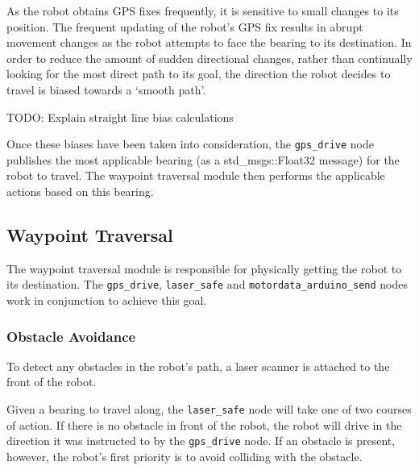 \documentclass[titlepage,12pt,a4paper]{article}
\begin{document}
As the robot obtains GPS fixes frequently, it is sensitive to small changes to its position. The frequent updating of the robot's GPS fix results in abrupt movement changes as the robot attempts to face the bearing to its destination. In order to reduce the amount of sudden directional changes, rather than continually looking for the most direct path to its goal, the direction the robot decides to travel is biased towards a `smooth path'.


TODO: Explain straight line bias calculations 


Once these biases have been taken into consideration, the \verb|gps_drive| node publishes the most applicable bearing (as a std\_msgs::Float32 message) for the robot to travel. The waypoint traversal module then performs the applicable actions based on this bearing.

\subsection{Waypoint Traversal}
The waypoint traversal module is responsible for physically getting the robot to its destination. The \verb|gps_drive|, \verb|laser_safe| and \verb|motordata_arduino_send| nodes work in conjunction to achieve this goal.

\subsubsection{Obstacle Avoidance}
To detect any obstacles in the robot's path, a laser scanner is attached to the front of the robot.

Given a bearing to travel along, the \verb|laser_safe| node will take one of two courses of action. If there is no obstacle in front of the robot, the robot will drive in the direction it was instructed to by the \verb|gps_drive| node. If an obstacle is present, however, the robot's first priority is to avoid colliding with the obstacle. 
\end{document}
